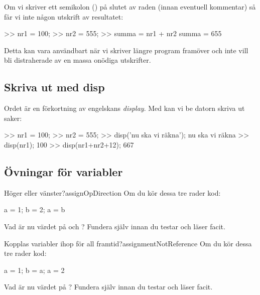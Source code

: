 Om vi skriver ett semikolon (\cw{;}) på slutet av raden (innan eventuell kommentar) så får vi inte någon utskrift av resultatet:

\begin{matlab}[caption={Hejda utskrift med semikolon},label={}]
>> nr1 = 100; %
>> nr2 = 555; %
>> summa = nr1 + nr2 %
summa =  655
\end{matlab}

Detta kan vara användbart när vi skriver längre program framöver och inte vill bli distraherade av en massa onödiga utskrifter.

\subsection{Skriva ut med disp}

Ordet  är en förkortning av engelskans \emph{display}. Med  kan vi be datorn skriva ut saker:

\begin{matlab}[caption={Skriv ut på kommando},label={}]
>> nr1 = 100;
>> nr2 = 555;
>> disp('nu ska vi räkna');
nu ska vi räkna
>> disp(nr1); %
100
>> disp(nr1+nr2+12); %
667
\end{matlab}
\newpage

\subsection{Övningar för variabler}

\begin{matteovning}{Höger eller vänster?}{assignOpDirection}
Om du kör dessa tre rader kod:
\vspace{10pt}
\begin{matlab}
a = 1;
b = 2;
a = b
\end{matlab}

Vad är nu värdet på  och ? Fundera själv innan du testar och läser facit.
\end{matteovning}

\begin{matteovning}{Kopplas variabler ihop för all framtid?}{assignmentNotReference}
Om du kör dessa tre rader kod:
\vspace{10pt}
\begin{matlab}
a = 1;
b = a;
a = 2
\end{matlab}

Vad är nu värdet på ? Fundera själv innan du testar och läser facit.
\end{matteovning}

